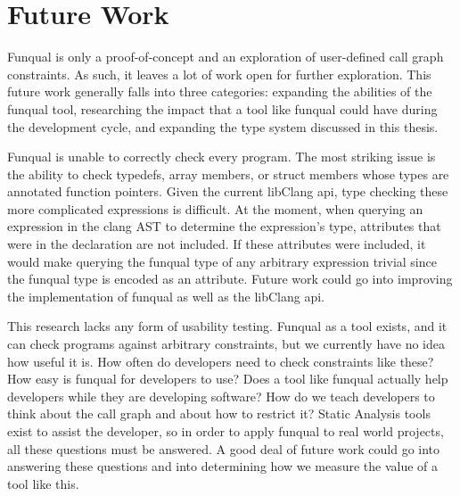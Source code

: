 \chapter{Future Work}\label{sec:future}

Funqual is only a proof-of-concept and an exploration of user-defined call graph constraints.  As such, it leaves a lot of work open for further exploration.  This future work generally falls into three categories: expanding the abilities of the funqual tool, researching the impact that a tool like funqual could have during the development cycle, and expanding the type system discussed in this thesis.  

Funqual is unable to correctly check every program.  The most striking issue is the ability to check typedefs, array members, or struct members whose types are annotated function pointers.  Given the current libClang api, type checking these more complicated expressions is difficult.  At the moment, when querying an expression in the clang AST to determine the expression's type, attributes that were in the declaration are not included.  If these attributes were included, it would make querying the funqual type of any arbitrary expression trivial since the funqual type is encoded as an attribute.  Future work could go into improving the implementation of funqual as well as the libClang api.  

This research lacks any form of usability testing.  Funqual as a tool exists, and it can check programs against arbitrary constraints, but we currently have no idea how useful it is.  How often do developers need to check constraints like these?  How easy is funqual for developers to use?  Does a tool like funqual actually help developers while they are developing software?  How do we teach developers to think about the call graph and about how to restrict it?  Static Analysis tools exist to assist the developer, so in order to apply funqual to real world projects, all these questions must be answered.  A good deal of future work could go into answering these questions and into determining how we measure the value of a tool like this.  

